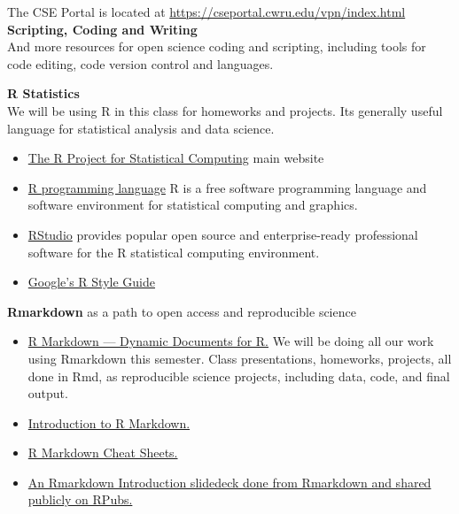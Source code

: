 \documentclass[11pt]{article} %
\begin{document}
    The CSE Portal is located at \href{"https://cseportal.cwru.edu/vpn/index.html"}{https://cseportal.cwru.edu/vpn/index.html}    \\
    
    {\bf Scripting, Coding and Writing} \\
    And more resources for open science coding and scripting, including tools for code editing, code version control and languages. 
    
    {\bf R Statistics} \\
    We will be using R in this class for homeworks and projects. 
    Its generally useful language for statistical analysis and data science. 
  
      \begin{itemize}
        \item \href{"http://www.r-project.org/index.html"}{The R Project for Statistical Computing}  \cite{r_r_2014} main website
        \item \href{"http://en.wikipedia.org/wiki/R_(programming_language)"}{R programming language}  R is a free software programming language and software environment for statistical computing and graphics.\cite{r_project_r_2014} 
        \item \href{"http://www.rstudio.com/"}{ RStudio} provides popular open source and enterprise-ready professional software for the R statistical computing environment. \cite{rstudio_rstudio_2014}
        \item \href{"https://google-styleguide.googlecode.com/svn/trunk/Rguide.xml"}{ Google's R Style Guide}
      \end{itemize}
    
    {\bf Rmarkdown} as a path to open access and reproducible science
    
      \begin{itemize}
        \item \href{"http://rmarkdown.rstudio.com/"}{ R Markdown — Dynamic Documents for R.} We will be doing all our work using Rmarkdown this semester. 
        Class presentations, homeworks, projects, all done in Rmd, as reproducible science projects, including data, code, and final output. 
        \item \href{"http://shiny.rstudio.com/articles/rmarkdown.html"}{ Introduction to R Markdown.}
        \item \href{"http://www.rstudio.com/resources/cheatsheets/"}{ R Markdown Cheat Sheets.}
        \item \href{"http://rpubs.com/mansun_kuo/24330"}{ An Rmarkdown Introduction slidedeck done from Rmarkdown and shared publicly on RPubs.}
      \end{itemize}
    
\end{document}
